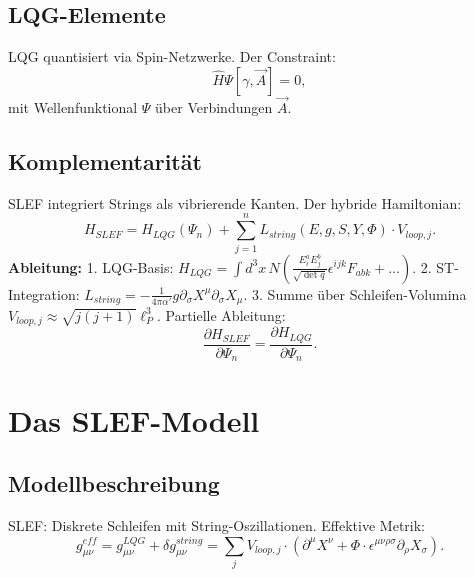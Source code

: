 \documentclass[11pt,a4paper]{article}
\begin{document}
	\subsection{LQG-Elemente}
	LQG quantisiert via Spin-Netzwerke. Der Constraint:
	\begin{equation}
		\hat{H} \Psi[\gamma, \vec{A}] = 0,
	\end{equation}
	mit Wellenfunktional $\Psi$ über Verbindungen $\vec{A}$.
	
	\subsection{Komplementarität}
	SLEF integriert Strings als vibrierende Kanten. Der hybride Hamiltonian:
	\begin{equation}
		H_{SLEF} = H_{LQG}(\Psi_n) + \sum_{j=1}^n L_{string}(E, g, S, Y, \Phi) \cdot V_{loop,j}.
	\end{equation}
	\textbf{Ableitung:}  
	1. LQG-Basis: $H_{LQG} = \int d^3x \, N \left( \frac{E_i^a E_j^b}{\sqrt{\det q}} \epsilon^{ijk} F_{abk} + \dots \right)$.  
	2. ST-Integration: $L_{string} = -\frac{1}{4\pi\alpha'} g \partial_\sigma X^\mu \partial_\sigma X_\mu$.  
	3. Summe über Schleifen-Volumina $V_{loop,j} \approx \sqrt{j(j+1)} \ell_P^3$.  
	Partielle Ableitung:  
	\begin{equation}
		\frac{\partial H_{SLEF}}{\partial \Psi_n} = \frac{\partial H_{LQG}}{\partial \Psi_n}.
	\end{equation}
	
	\section{Das SLEF-Modell}
	
	\subsection{Modellbeschreibung}
	SLEF: Diskrete Schleifen mit String-Oszillationen. Effektive Metrik:
	\begin{equation}
		g_{\mu\nu}^{eff} = g_{\mu\nu}^{LQG} + \delta g_{\mu\nu}^{string} = \sum_j V_{loop,j} \cdot \left( \partial^\mu X^\nu + \Phi \cdot \epsilon^{\mu\nu\rho\sigma} \partial_\rho X_\sigma \right).
	\end{equation}
	
\end{document}
